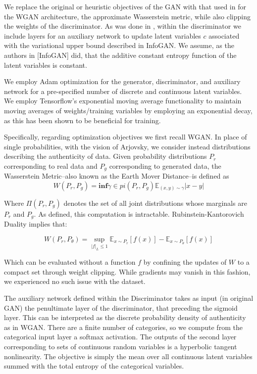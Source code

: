 \documentclass{article}
\begin{document}
	We replace the original or heuristic objectives of the GAN with that used in \cite{Arjovsky2017WassersteinGAN} for the WGAN architecture, the approximate Wasserstein metric, while also clipping the weights of the discriminator.  As was done in \cite{Chen2016InfoGAN:Nets}, within the discriminator we include layers for an auxiliary network to update latent variables $c$ associated with the variational upper bound described in InfoGAN.  We assume, as the authors in [InfoGAN] did, that the additive constant entropy function of the latent variables is constant.
    
	We employ Adam optimization for the generator, discriminator, and auxiliary network for a pre-specified number of discrete and continuous latent variables.  We employ Tensorflow's exponential moving average functionality to maintain moving averages of weights/training variables by employing an exponential decay, as this has been shown to be beneficial for training.
    
Specifically, regarding optimization objectives we first recall WGAN. In place of single probabilities, with the vision of Arjovsky, we consider instead distributions describing the authenticity of data. Given probability distributions $P_r $ corresponding to real data and 
$P_g $ corresponding to generated data, the Wasserstein Metric--also known as the Earth Mover Distance--is defined as
\[
W(P_r,P_g) = \textbf{inf}{\gamma \in pi(P_r ,P_g)} \mathbb{E}_{(x, y) \sim \gamma} |x - y|
\]

Where $ \Pi(P_r,P_g) $ denotes the set of all joint distributions whose marginals are $P_r$ and $P_g$.  As defined, this computation is intractable.   Rubinstein-Kantorovich Duality implies that:
  
\[
W(P_r,P_\theta ) = \sup_{|f|_L \leq 1} \mathbb{E}_{x\sim P_r}[f(x)] - \mathbb{E}_{x \sim P_\theta}[f(x)] 
\]

Which can be evaluated without a function $f $ by confining the updates of $ W $ to a compact set through weight clipping.  While gradients may vanish in this fashion, we experienced no such issue with the dataset. 

The auxiliary network defined within the Discriminator takes as input (in original GAN) the penultimate  layer of the discriminator, that preceding the sigmoid layer. This can be interpreted as the discrete probability density of authenticity as in WGAN.  There are a finite number of categories, so we compute from the categorical input layer a softmax activation.  The outputs of the second layer corresponding to sets of continuous random variables is a hyperbolic tangent nonlinearity.  The objective is simply the mean over all continuous latent variables summed with the total entropy of the categorical variables.
\end{document}
